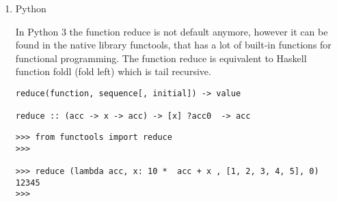 \documentclass[11pt]{article}
\begin{document}
\begin{enumerate}
\begin{verbatim}
 foldr :: (a -> b -> b) -> b -> [a] -> b
 foldr f z []     = z
 foldr f z (x:xs) = f x (foldr f z xs)
\end{verbatim}

\begin{verbatim}
> foldr (\x acc -> 10 * acc + x) 0 [1, 2, 3, 4, 5] 
54321

> (f 0 5)
5
> (f (f 0 5) 4)
54
> (f (f (f 0 5) 4) 3)
543
> (f (f (f (f 0 5) 4) 3) 2)
5432
> (f (f (f (f (f 0 5) 4) 3) 2) 1)
54321
> 

 --
 -- Derive fold_right from foldl (fold left)
 -- 

> let fold_right f acc xs = foldl (\x acc -> f acc x) acc (reverse xs)
> 
> :t fold_right
fold_right :: (b -> a -> a) -> a -> [b] -> a
> 
> 
> fold_right (\x acc -> 10 * acc + x) 0 [1, 2, 3, 4, 5]
54321
>
\end{verbatim}

Evaluation of Fold Right:

\begin{verbatim}
Example:

> foldr (\x acc -> 10 * acc + x ) 0 [1, 2, 3, 4, 5]
54321
>

f  = \x acc -> 10 * acc + x
S0 = 0
n = 5
                       x acc
S1   = f x4 S0     = f 5  0    = 10 * 0    + 5 = 5
S2   = f x3 S1     = f 4  5    = 10 * 5    + 4 = 54
S3   = f x2 S2     = f 3  54   = 10 * 54   + 3 = 543
S4   = f x1 S3     = f 2  543  = 10 * 543  + 2 = 5432
S5   = f x0 S4     = f 1  5432 = 10 * 5432 + 1 = 54321
\end{verbatim}

\item Python
\label{sec-1-9-4-3}

In Python 3 the function reduce is not default anymore, however it can
be found in the native library functools, that has a lot of built-in
functions for functional programming. The function reduce is equivalent
to Haskell function foldl (fold left) which is tail recursive.

\begin{verbatim}
reduce(function, sequence[, initial]) -> value

reduce :: (acc -> x -> acc) -> [x] ?acc0  -> acc
\end{verbatim}

\begin{verbatim}
>>> from functools import reduce
>>> 

>>> reduce (lambda acc, x: 10 *  acc + x , [1, 2, 3, 4, 5], 0)
12345
>>> 


\end{verbatim}
\end{enumerate}
\end{document}
